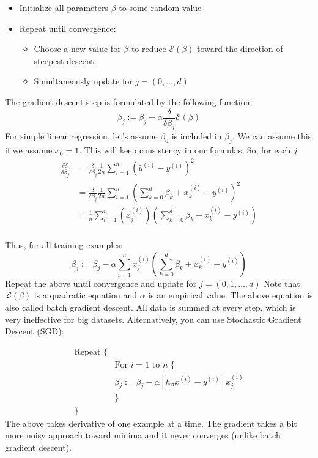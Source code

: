 \documentclass[../main.tex]{subfiles}
\begin{document}
\begin{itemize}
	\item Initialize all parameters \(\beta\) to some random value
	\item Repeat until convergence:
\begin{itemize}
	\item Choose a new value for \(\beta\) to reduce \(\mathcal{E}(\beta)\) toward the direction of steepest descent.
	\item Simultaneously update for \(j = (0, \dots, d)\)
\end{itemize}
\end{itemize}
The gradient descent step is formulated by the following function:
\[
	\beta_j := \beta_j - \alpha \frac{\delta}{\delta\beta_j}\mathcal{E}(\beta)
\]
For simple linear regression, let's assume \(\beta_0\) is included in \(\beta_j\). We can assume this if we assume \(x_0 = 1\). This will keep consistency in our formulas. So, for each \(j\) 
\begin{align*}
	\frac{\delta\mathcal{E}}{\delta\beta_j} &= \frac{\delta}{\delta\beta_j}\frac{1}{2n}\sum_{i=1}^n \left(\hat y^{(i)} - y^{(i)}\right)^2 \\
										  &= \frac{\delta}{\delta\beta_j}\frac{1}{2n}\sum_{i=1}^n \left(\sum_{k=0}^d\beta_k + x_k^{(i)} - y^{(i)}\right)^2 \\
										  &= \frac{1}{n}\sum_{i=1}^n (x_j^{(i)})\left(\sum_{k=0}^d\beta_k + x_k^{(i)} - y^{(i)}\right) \\
\end{align*}

Thus, for all training examples:
\[
	\beta_j := \beta_j - \alpha \sum_{i=1}^n x_j^{(i)}\left(\sum_{k=0}^d\beta_k + x_k^{(i)} - y^{(i)}\right)
\]
Repeat the above until convergence and update for \(j = (0,1,\dots,d)\)
Note that \(\mathcal{L}(\beta)\) is a quadratic equation and \(\alpha\) is an empirical value. The above equation is also called batch gradient descent. All data is summed at every step, which is very ineffective for big datasets. Alternatively, you can use Stochastic Gradient Descent (SGD): 

\begin{align*}
	\text{Repeat \{} \\
	&\text{For }i=1 \text{ to } n \text{ \{} \\
	&\beta_j := \beta_j - \alpha\left[h_\beta x^{(i)} - y^{(i)}\right]x_j^{(i)}\\
	&\text{\}} \\
	\text{\}}
\end{align*}
The above takes derivative of one example at a time. The gradient takes a bit more noisy approach toward minima and it never converges (unlike batch gradient descent).
\end{document}

